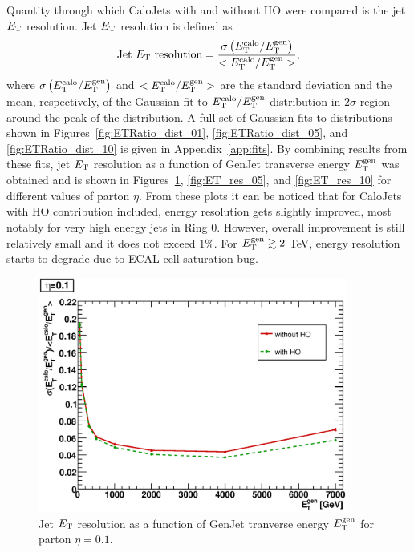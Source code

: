 \documentclass{cmspaper}
\begin{document}
Quantity through which CaloJets with and without HO were compared is the jet $E_\text T$ resolution. Jet $E_\text T$ resolution is defined as
\begin{equation}
 \text{Jet }E_\text T\text{ resolution}=\frac{\sigma\left(E^\text{calo}_\text T/E^\text{gen}_\text T \right)}{<E^\text{calo}_\text T/E^\text{gen}_\text T>},
\end{equation} 
where $\sigma\left(E^\text{calo}_\text T/E^\text{gen}_\text T \right)$ and $<E^\text{calo}_\text T/E^\text{gen}_\text T>$ are the standard deviation and the mean, respectively, of the Gaussian fit to $E^\text{calo}_\text T/E^\text{gen}_\text T$ distribution in $2\sigma$ region around the peak of the distribution. A full set of Gaussian fits to distributions shown in Figures~\ref{fig:ETRatio_dist_01}, \ref{fig:ETRatio_dist_05}, and \ref{fig:ETRatio_dist_10} is given in Appendix~\ref{app:fits}. By combining results from these fits, jet $E_\text T$ resolution as a function of GenJet transverse energy $E^\text{gen}_\text T$ was obtained and is shown in Figures~\ref{fig:ET_res_01}, \ref{fig:ET_res_05}, and \ref{fig:ET_res_10} for different values of parton $\eta$. From these plots it can be noticed that for CaloJets with HO contribution included, energy resolution gets slightly improved, most notably for very high energy jets in Ring $0$. However, overall improvement is still relatively small and it does not exceed $1\%$. For $E^\text{gen}_\text T\gtrsim2$ TeV, energy resolution starts to degrade due to ECAL cell saturation bug.
\begin{figure}
 \centering
 \includegraphics[width=4in]{figs/ET_resolution_corr_eta0.1.eps}
 \caption{Jet $E_\text T$ resolution as a function of GenJet tranverse energy $E^\text{gen}_\text T$ for parton $\eta=0.1$.}
 \label{fig:ET_res_01}
\end{figure}
\end{document}
